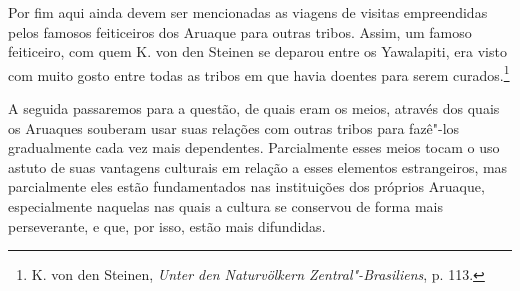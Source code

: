 Por fim aqui ainda devem ser mencionadas as viagens de visitas
empreendidas pelos famosos feiticeiros dos Aruaque para outras tribos.
Assim, um famoso feiticeiro, com quem K. von den Steinen se deparou
entre os Yawalapiti, era visto com muito gosto entre todas as tribos em
que havia doentes para serem curados.\footnote{K. von den Steinen,
  \emph{Unter den Naturvölkern Zentral"-Brasiliens}, p. 113.}


A seguida passaremos para a questão, de quais eram os meios, através dos
quais os Aruaques souberam usar suas relações com outras tribos para
fazê"-los gradualmente cada vez mais dependentes. Parcialmente esses
meios tocam o uso astuto de suas vantagens culturais em relação a esses
elementos estrangeiros, mas parcialmente eles estão fundamentados nas
instituições dos próprios Aruaque, especialmente naquelas nas quais a
cultura se conservou de forma mais perseverante, e que, por isso, estão
mais difundidas.

